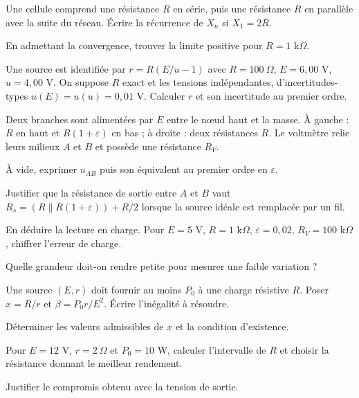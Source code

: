 \begin{questions}
\item Une cellule comprend une résistance $R$ en série, puis une résistance $R$ en parallèle avec la suite du réseau. Écrire la récurrence de $X_n$ si $X_1=2R$.
\item En admettant la convergence, trouver la limite positive pour $R=1$ k$\Omega$.
\end{questions}

\begin{questions}
\item Une source est identifiée par $r=R(E/u-1)$ avec $R=100\ \Omega$, $E=6{,}00$ V, $u=4{,}00$ V. On suppose $R$ exact et les tensions indépendantes, d’incertitudes-types $u(E)=u(u)=0{,}01$ V. Calculer $r$ et son incertitude au premier ordre.
\end{questions}



\label{ex-D1}
Deux branches sont alimentées par $E$ entre le nœud haut et la masse. À gauche : $R$ en haut et $R(1+\varepsilon)$ en bas ; à droite : deux résistances $R$. Le voltmètre relie leurs milieux $A$ et $B$ et possède une résistance $R_V$.
\begin{questions}
\item À vide, exprimer $u_{AB}$ puis son équivalent au premier ordre en $\varepsilon$.
\item Justifier que la résistance de sortie entre $A$ et $B$ vaut $R_s=(R\parallel R(1+\varepsilon))+R/2$ lorsque la source idéale est remplacée par un fil.
\item En déduire la lecture en charge. Pour $E=5$ V, $R=1$ k$\Omega$, $\varepsilon=0{,}02$, $R_V=100$ k$\Omega$, chiffrer l’erreur de charge.
\item Quelle grandeur doit-on rendre petite pour mesurer une faible variation ?
\end{questions}


\label{ex-D2}
\begin{questions}
\item Une source $(E,r)$ doit fournir au moins $P_0$ à une charge résistive $R$. Poser $x=R/r$ et $\beta=P_0r/E^2$. Écrire l’inégalité à résoudre.
\item Déterminer les valeurs admissibles de $x$ et la condition d’existence.
\item Pour $E=12$ V, $r=2\ \Omega$ et $P_0=10$ W, calculer l’intervalle de $R$ et choisir la résistance donnant le meilleur rendement.
\item Justifier le compromis obtenu avec la tension de sortie.
\end{questions}


